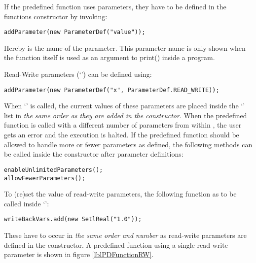 
If the predefined function uses parameters, they have to be defined in the functions constructor by invoking:
\begin{lstlisting}[frame=none,numbers=none]
addParameter(new ParameterDef("value"));
\end{lstlisting}

Hereby  is the name of the parameter. This parameter name is only shown when the function itself is used as an argument to print() inside a \SetlX{} program.

Read-Write parameters (`') can be defined using:
\begin{lstlisting}[frame=none,numbers=none]
addParameter(new ParameterDef("x", ParameterDef.READ_WRITE));
\end{lstlisting}

When `' is called, the current values of these parameters are placed inside the `' list in \emph{the same order as they are added in the constructor}. When the predefined function is called with a different number of parameters from within \SetlX{}, the user gets an error and the execution is halted. If the predefined function should be allowed to handle more or fewer parameters as defined, the following methods can be called inside the constructor after parameter definitions:
\begin{lstlisting}[frame=none,numbers=none]
enableUnlimitedParameters();
allowFewerParameters();
\end{lstlisting}

To (re)set the value of read-write parameters, the following function as to be called inside `':
\begin{lstlisting}[frame=none,numbers=none]
writeBackVars.add(new SetlReal("1.0"));
\end{lstlisting}

These have to occur in \emph{the same order and number} as read-write parameters are defined in the constructor. A predefined function using a single read-write parameter is shown in figure \ref{lblPDFunctionRW}.



